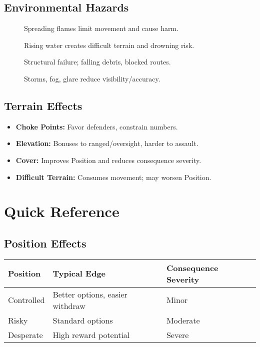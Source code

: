 \subsection{Environmental Hazards}
\label{subsec:environmental-hazards}

\begin{description}
  \item[] Spreading flames limit movement and cause harm. 
  \item[] Rising water creates difficult terrain and drowning risk. 
  \item[] Structural failure; falling debris, blocked routes. 
  \item[] Storms, fog, glare reduce visibility/accuracy. 
\end{description}

\subsection{Terrain Effects}
\label{subsec:terrain-effects}

\begin{itemize}
  \item \textbf{Choke Points:} Favor defenders, constrain numbers.
  \item \textbf{Elevation:} Bonuses to ranged/oversight, harder to assault.
  \item \textbf{Cover:} Improves Position and reduces consequence severity.
  \item \textbf{Difficult Terrain:} Consumes movement; may worsen Position.
\end{itemize}

\section{Quick Reference}
\label{sec:combat-quick-ref}

\subsection{Position Effects}
\label{subsec:position-quick-ref}

\begin{center}
\begin{tabular}{lll}
\toprule
\textbf{Position} & \textbf{Typical Edge} & \textbf{Consequence Severity} \\
\midrule
Controlled & Better options, easier withdraw & Minor \\
Risky      & Standard options               & Moderate \\
Desperate  & High reward potential           & Severe \\
\bottomrule
\end{tabular}
\end{center}

